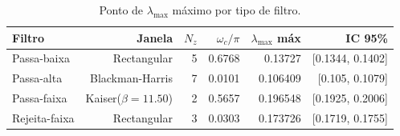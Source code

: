 \begin{table}[htbp]
  \centering
  \caption{Ponto de $\lambda_{\max}$ máximo por tipo de filtro.}
  \begin{tabular}{lrrrrr}
    \toprule
    Filtro & Janela & $N_z$ & $\omega_c/\pi$ & $\lambda_{\max}$ máx & IC 95\% \\
    \midrule
    Passa-baixa & Rectangular & 5 & 0.6768 & 0.13727 & [0.1344, 0.1402] \\
    Passa-alta & Blackman-Harris & 7 & 0.0101 & 0.106409 & [0.105, 0.1079] \\
    Passa-faixa & Kaiser($\beta=11.50$) & 2 & 0.5657 & 0.196548 & [0.1925, 0.2006] \\
    Rejeita-faixa & Rectangular & 3 & 0.0303 & 0.173726 & [0.1719, 0.1755] \\
    \bottomrule
  \end{tabular}
\end{table}
